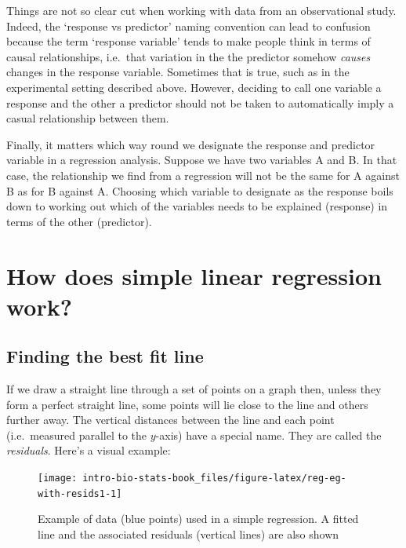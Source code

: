 \documentclass[
]{book}
\begin{document}
Things are not so clear cut when working with data from an observational study. Indeed, the `response vs predictor' naming convention can lead to confusion because the term `response variable' tends to make people think in terms of causal relationships, i.e.~that variation in the the predictor somehow \emph{causes} changes in the response variable. Sometimes that is true, such as in the experimental setting described above. However, deciding to call one variable a response and the other a predictor should not be taken to automatically imply a casual relationship between them.

Finally, it matters which way round we designate the response and predictor variable in a regression analysis. Suppose we have two variables A and B. In that case, the relationship we find from a regression will not be the same for A against B as for B against A. Choosing which variable to designate as the response boils down to working out which of the variables needs to be explained (response) in terms of the other (predictor).

\hypertarget{how-does-simple-linear-regression-work}{%
\section{How does simple linear regression work?}\label{how-does-simple-linear-regression-work}}

\hypertarget{finding-the-best-fit-line}{%
\subsection{Finding the best fit line}\label{finding-the-best-fit-line}}

If we draw a straight line through a set of points on a graph then, unless they form a perfect straight line, some points will lie close to the line and others further away. The vertical distances between the line and each point (i.e.~measured parallel to the \(y\)-axis) have a special name. They are called the \emph{residuals}. Here's a visual example:

\begin{figure}

{\centering \texttt{[image: intro-bio-stats-book\_files/figure-latex/reg-eg-with-resids1-1]} 

}

\caption{Example of data (blue points) used in a simple regression. A fitted line and the associated residuals (vertical lines) are also shown}\label{fig:reg-eg-with-resids1}
\end{figure}
\end{document}
